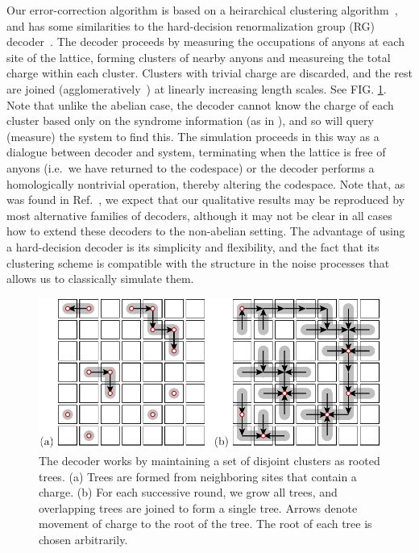 \documentclass[aps, prl, letterpaper, twocolumn, superscriptaddress, notitlepage, 10pt]{revtex4-1}
\newcommand{\cggb}[1]{\textcolor{blue}{#1}}
\newcommand{\dude}[1]{\textcolor{red}{#1}}
\begin{document}
Our error-correction algorithm is
based on a heirarchical clustering algorithm~\cite{Hastie2009},
and has some 
similarities to the hard-decision renormalization group (RG) decoder~\cite{Bravyi2011}. 
The decoder proceeds by measuring the occupations of 
anyons at each site of the lattice, forming clusters of nearby anyons and 
measureing the total charge within each cluster.
Clusters with trivial charge are discarded, and
the rest are joined (agglomeratively~\cite{Hastie2009})
at linearly increasing length scales.
See FIG. \ref{f:decode}.
Note that unlike the abelian case, the decoder
cannot know the charge of each cluster based only
on the syndrome information (as in \cite{Bravyi2011}),
and so will query (measure) the system to find this.
The simulation proceeds in this way as a dialogue between decoder
and system, terminating when the lattice 
is free of anyons (i.e.~we have returned to the codespace) 
or the decoder performs a homologically nontrivial operation, thereby altering the codespace.
Note that, as was found in Ref.~\cite{Brell2013}, we expect that our qualitative results may be reproduced by most alternative families of decoders, although it may not be clear in all cases how to extend these decoders to the non-abelian setting.
The advantage of using a hard-decision decoder is 
its simplicity and flexibility, and the fact that its clustering scheme is compatible with the structure in the noise processes that allows us to classically simulate them.

\begin{figure}[th!]
\begin{center}
	\includegraphics[width=1.0\columnwidth]{pic-decode.pdf}
\caption{The decoder works by maintaining a set of disjoint clusters as rooted trees.
(a) Trees are formed from neighboring sites that contain a charge.
(b) For each successive round, we grow all trees, 
and overlapping trees are joined to form
a single tree. Arrows denote movement of charge to the root of the tree.
The root of each tree is chosen arbitrarily.
}
\label{f:decode}
\end{center}
\end{figure}
\end{document}
